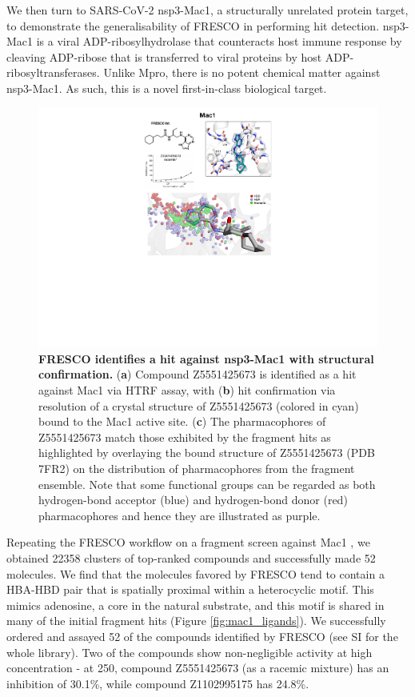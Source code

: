 We then turn to SARS-CoV-2 nsp3-Mac1, a structurally unrelated protein target, to demonstrate the generalisability of FRESCO in performing hit detection. nsp3-Mac1 is a viral ADP-ribosylhydrolase that counteracts host immune response by cleaving ADP-ribose that is transferred to viral proteins by host ADP-ribosyltransferases. Unlike Mpro, there is no potent chemical matter against nsp3-Mac1. As such, this is a novel first-in-class biological target. 

\begin{figure}[!b]
    \centering
    \includegraphics[width=0.75\linewidth]{Chapters/Fresco/Figs/mac1_fig.pdf}
    \caption{\textbf{FRESCO identifies a hit against nsp3-Mac1 with structural confirmation.} (\textbf{a}) Compound Z5551425673 is identified as a hit against Mac1 via HTRF assay, with (\textbf{b}) hit confirmation via resolution of a crystal structure of Z5551425673 (colored in cyan) bound to the Mac1 active site. (\textbf{c}) The pharmacophores of Z5551425673 match those exhibited by the fragment hits as highlighted by overlaying the bound structure of Z5551425673 (PDB 7FR2) on the distribution of pharmacophores from the fragment ensemble. Note that some functional groups can be regarded as both hydrogen-bond acceptor (blue) and hydrogen-bond donor (red) pharmacophores and hence they are illustrated as purple.}
    \label{fig:mac1_hit}
   \end{figure}

Repeating the FRESCO workflow on a fragment screen against Mac1 \cite{Schuller2021Mac1Frag}, we obtained 22358 clusters of top-ranked compounds and successfully made 52 molecules. We find that the molecules favored by FRESCO tend to contain a HBA-HBD pair that is spatially proximal within a heterocyclic motif. This mimics adenosine, a core in the natural substrate, and this motif is shared in many of the initial fragment hits (Figure \ref{fig:mac1_ligands}). We successfully ordered and assayed 52 of the compounds identified by FRESCO (see SI for the whole library). Two of the compounds show non-negligible activity at high concentration - at 250\uM, compound Z5551425673 (as a racemic mixture) has an inhibition of 30.1\%, while compound Z1102995175 has 24.8\%.

